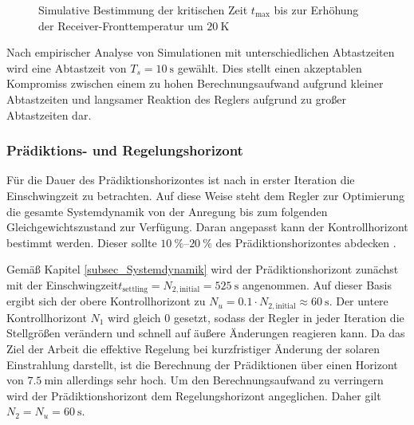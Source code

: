 \begin{figure}[h!]
    \centering
    \setlength{\fboxsep}{1pt}
    \setlength{\fboxrule}{1pt}
    \caption[Simulative Bestimmung der kritischen Zeit $t_{\mathrm{max}}$ bis zur Erhöhung der Receiver-Fronttemperatur um $\SI{10}{\kelvin}$]{Simulative Bestimmung der kritischen Zeit $t_{\mathrm{max}}$ bis zur Erhöhung der Receiver-Fronttemperatur um $\SI{20}{\kelvin}$}
    \label{fig_SampleTimebestimmen}
\end{figure}

Nach empirischer Analyse von Simulationen mit unterschiedlichen Abtastzeiten wird eine Abtastzeit von $T_s=\SI{10}{\second}$ gewählt.
Dies stellt einen akzeptablen Kompromiss zwischen einem zu hohen Berechnungsaufwand aufgrund kleiner Abtastzeiten und langsamer Reaktion des Reglers aufgrund zu großer Abtastzeiten dar.


\subsubsection*{Prädiktions- und Regelungshorizont} \label{subsubsec_horizonte}
Für die Dauer des Prädiktionshorizontes ist nach \cite{Bemporad} in erster Iteration die Einschwingzeit zu betrachten.
Auf diese Weise steht dem Regler zur Optimierung die gesamte Systemdynamik von der Anregung bis zum folgenden Gleichgewichtszustand zur Verfügung.
Daran angepasst kann der Kontrollhorizont bestimmt werden.
Dieser sollte $\SIrange{10}{20}{\percent}$ des Prädiktionshorizontes abdecken \cite{Bemporad}.

Gemäß Kapitel \ref{subsec_Systemdynamik} wird der Prädiktionshorizont zunächst mit der Einschwingzeit\linebreak $t_{\mathrm{settling}} = N_{2,\mathrm{initial}} = \SI{525}{\second}$ angenommen.
Auf dieser Basis ergibt sich der obere Kontrollhorizont zu $N_u = 0.1\cdot N_{2,\mathrm{initial}} \approx \SI{60}{\second}$.
Der untere Kontrollhorizont $N_1$ wird gleich $0$ gesetzt, sodass der Regler in jeder Iteration die Stellgrößen verändern und schnell auf äußere Änderungen reagieren kann.
Da das Ziel der Arbeit die effektive Regelung bei kurzfristiger Änderung der solaren Einstrahlung darstellt, ist die Berechnung der Prädiktionen über einen Horizont von $\SI{7.5}{\minute}$ allerdings sehr hoch.
Um den Berechnungsaufwand zu verringern wird der Prädiktionshorizont dem Regelungshorizont angeglichen.
Daher gilt $N_2 = N_u = \SI{60}{\second}$.

